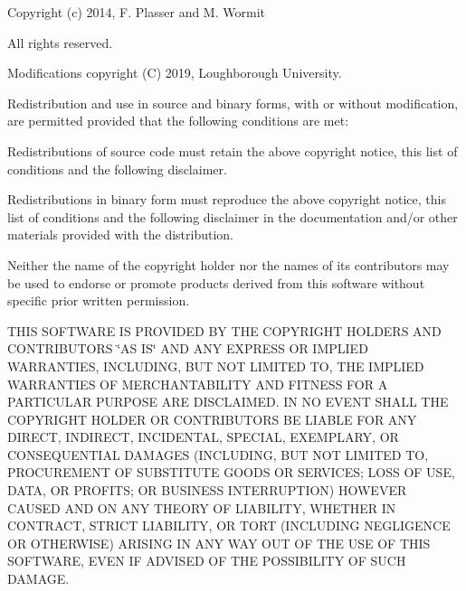 \begin{DoxyCopyright}{Copyright}
(c) 2014, F. Plasser and M. Wormit 

All rights reserved. 

Modifications copyright (C) 2019, Loughborough University. 

Redistribution and use in source and binary forms, with or without modification, are permitted provided that the following conditions are met\+: 


\begin{DoxyEnumerate}
\item Redistributions of source code must retain the above copyright notice, this list of conditions and the following disclaimer.
\item Redistributions in binary form must reproduce the above copyright notice, this list of conditions and the following disclaimer in the documentation and/or other materials provided with the distribution.
\item Neither the name of the copyright holder nor the names of its contributors may be used to endorse or promote products derived from this software without specific prior written permission. 
\end{DoxyEnumerate}

THIS SOFTWARE IS PROVIDED BY THE COPYRIGHT HOLDERS AND CONTRIBUTORS \char`\"{}\+AS IS\char`\"{} AND ANY EXPRESS OR IMPLIED WARRANTIES, INCLUDING, BUT NOT LIMITED TO, THE IMPLIED WARRANTIES OF MERCHANTABILITY AND FITNESS FOR A PARTICULAR PURPOSE ARE DISCLAIMED. IN NO EVENT SHALL THE COPYRIGHT HOLDER OR CONTRIBUTORS BE LIABLE FOR ANY DIRECT, INDIRECT, INCIDENTAL, SPECIAL, EXEMPLARY, OR CONSEQUENTIAL DAMAGES (INCLUDING, BUT NOT LIMITED TO, PROCUREMENT OF SUBSTITUTE GOODS OR SERVICES; LOSS OF USE, DATA, OR PROFITS; OR BUSINESS INTERRUPTION) HOWEVER CAUSED AND ON ANY THEORY OF LIABILITY, WHETHER IN CONTRACT, STRICT LIABILITY, OR TORT (INCLUDING NEGLIGENCE OR OTHERWISE) ARISING IN ANY WAY OUT OF THE USE OF THIS SOFTWARE, EVEN IF ADVISED OF THE POSSIBILITY OF SUCH DAMAGE. 
\end{DoxyCopyright}
